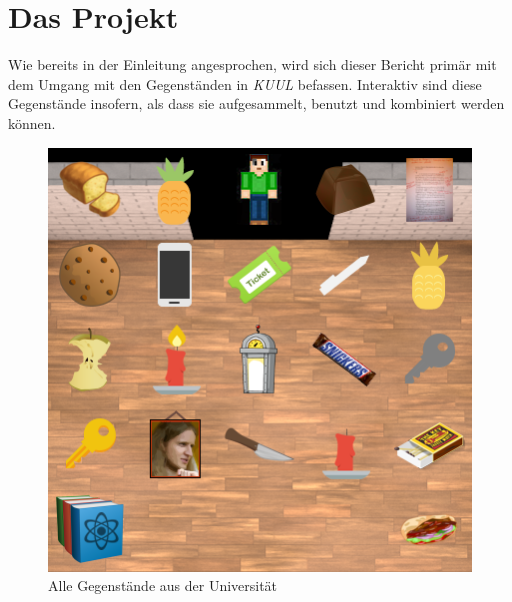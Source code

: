 \documentclass[12pt,twoside]{article}
\theoremstyle{plain}
\theoremstyle{definition}
\theoremstyle{remark}
\begin{document}
\section{Das Projekt}
\label{sec:main}
Wie bereits in der Einleitung angesprochen, wird sich dieser Bericht primär mit dem Umgang mit den Gegenständen in \textit{KUUL} befassen.
Interaktiv sind diese Gegenstände insofern, als dass sie aufgesammelt, benutzt und kombiniert werden können.\\
\begin{figure}[h!bt]
    \begin{center}
        \includegraphics[scale=1]{Gegenstaende_Welt-1.png}
    	\caption{Alle Gegenstände aus der Universität}
        \label{fig:main_items}
    \end{center}
\end{figure}

%
%
\end{document}
